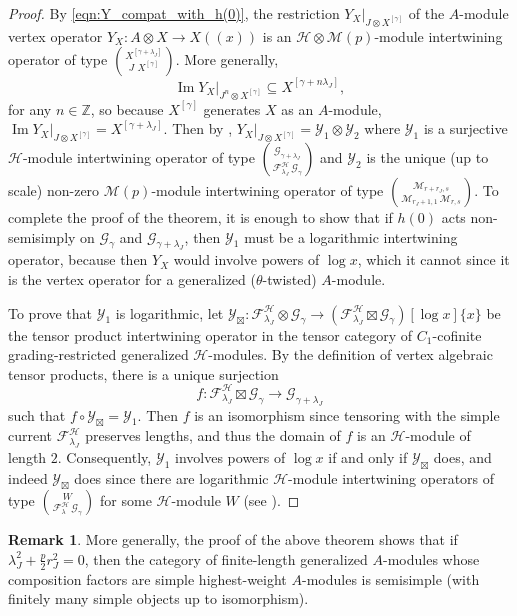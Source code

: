 \documentclass[11pt, reqno]{amsart}
\theoremstyle{definition}\newtheorem{defi}[thm]{Definition}
\theoremstyle{definition}\newtheorem{rem}[thm]{Remark}
\theoremstyle{definition}\newtheorem{exam}[thm]{Example}
\theoremstyle{definition}\newtheorem{assum}[thm]{Assumption}
\newcommand{\cH}{\mathcal{H}}
\newcommand{\cY}{\mathcal{Y}}
\newcommand{\cM}{\mathcal{M}}
\newcommand{\cF}{\mathcal{F}}
\newcommand{\cG}{\mathcal{G}}
\newcommand{\ZZ}{\mathbb{Z}}
\newcommand{\tens}{\boxtimes}
\DeclareMathOperator{\im}{Im}
\begin{document}
\begin{proof}
By \eqref{eqn:Y_compat_with_h(0)}, the restriction $Y_X\vert_{J\otimes X^{[\gamma]}}$ of the $A$-module vertex operator $Y_X: A\otimes X\rightarrow X((x))$ is an $\cH\otimes\cM(p)$-module intertwining operator of type $\binom{X^{[\gamma+\lambda_J]}}{J\,\,X^{[\gamma]}}$. More generally,
\begin{equation*}
\im Y_X\vert_{J^n\otimes X^{[\gamma]}}\subseteq X^{[\gamma+n\lambda_J]},
\end{equation*}
for any $n\in\ZZ$, so because $X^{[\gamma]}$ generates $X$ as an $A$-module, $\im Y_X\vert_{J\otimes X^{[\gamma]}}=X^{[\gamma+\lambda_J]}$. Then by \cite[Theorem 2.10]{ADL}, $Y_X\vert_{J\otimes X^{[\gamma]}}=\cY_1\otimes\cY_2$ where $\cY_1$ is a surjective $\cH$-module intertwining operator of type $\binom{\cG_{\gamma+\lambda_J}}{\cF^\cH_{\lambda_J}\,\cG_{\gamma}}$ and $\cY_2$ is the unique (up to scale) non-zero $\cM(p)$-module intertwining operator of type $\binom{\cM_{r+r_J,s}}{\cM_{r_J+1,1}\,\cM_{r,s}}$. To complete the proof of the theorem, it is enough to show that if $h(0)$ acts non-semisimply on $\cG_\gamma$ and $\cG_{\gamma+\lambda_J}$, then $\cY_1$ must be a logarithmic intertwining operator, because then $Y_X$ would involve powers of $\log x$, which it cannot since it is the vertex operator for a generalized ($\theta$-twisted) $A$-module.



To prove that $\cY_1$ is logarithmic, let $\cY_\tens:\cF^\cH_{\lambda_J}\otimes\cG_\gamma\rightarrow(\cF^\cH_{\lambda_J}\tens\cG_\gamma)[\log x]\lbrace x\rbrace$ be the tensor product intertwining operator in the tensor category of $C_1$-cofinite grading-restricted generalized $\cH$-modules. By the definition of vertex algebraic tensor products, there is a unique surjection 
\begin{equation*}
f: \cF^\cH_{\lambda_J}\tens\cG_{\gamma}\longrightarrow\cG_{\gamma+\lambda_J}
\end{equation*}
such that $f\circ\cY_\tens=\cY_1$. Then $f$ is an isomorphism since tensoring with the simple current $\cF^\cH_{\lambda_J}$ preserves lengths, and thus the domain of $f$ is an $\cH$-module of length $2$. Consequently, $\cY_1$ involves powers of $\log x$ if and only if $\cY_\tens$ does, and indeed $\cY_\tens$ does since there are logarithmic $\cH$-module intertwining operators of type $\binom{W}{\cF^\cH_\lambda\,\cG_\gamma}$ for some $\cH$-module $W$ (see \cite[Theorem 5.5]{M}).
\end{proof}

\begin{rem}\label{rem:hw_ss}
More generally, the proof of the above theorem shows that if $\lambda_J^2+\frac{p}{2}r_J^2=0$, then the category of finite-length generalized $A$-modules whose composition factors are simple highest-weight $A$-modules is semisimple (with finitely many simple objects up to isomorphism).
\end{rem}
\end{document}
